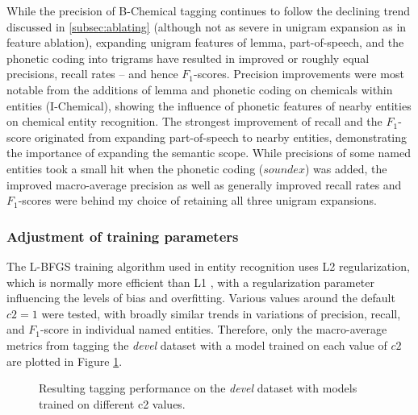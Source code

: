 \documentclass[10pt, oneside]{article}
\begin{document}
While the precision of B-Chemical tagging continues to follow the declining trend discussed in \ref{subsec:ablating} (although not as severe in unigram expansion as in feature ablation), expanding unigram features of lemma, part-of-speech, and the phonetic coding into trigrams have resulted in improved or roughly equal precisions, recall rates -- and hence $F_1$-scores. Precision improvements were most notable from the additions of lemma and phonetic coding on chemicals within entities (I-Chemical), showing the influence of phonetic features of nearby entities on chemical entity recognition. The strongest improvement of recall and the $F_1$-score originated from expanding part-of-speech to nearby entities, demonstrating the importance of expanding the semantic scope. While precisions of some named entities took a small hit when the phonetic coding ($soundex$) was added, the improved macro-average precision as well as generally improved recall rates and $F_1$-scores were behind my choice of retaining all three unigram expansions.

\subsubsection{Adjustment of training parameters}

The L-BFGS training algorithm used in entity recognition uses L2 regularization, which is normally more efficient than L1 \cite{cortes20092}, with a regularization parameter influencing the levels of bias and overfitting. Various values around the default $c2 = 1$ were tested, with broadly similar trends in variations of precision, recall, and $F_1$-score in individual named entities. Therefore, only the macro-average metrics from tagging the \emph{devel} dataset with a model trained on each value of $c2$ are plotted in Figure \ref{fig:c2}.

 \begin{figure}[h]
\begin{center}
\caption{\label{fig:c2} Resulting tagging performance on the \emph{devel} dataset with models trained on different c2 values.}
\end{center}
\end{figure}
\end{document}
